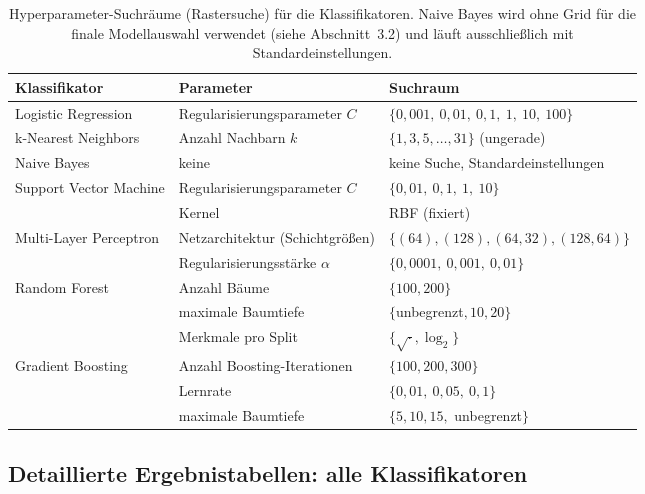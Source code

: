 \documentclass[10pt]{scrartcl}
\begin{document}
\begin{table}[H]
    \centering
    \footnotesize
    \setlength{\tabcolsep}{4pt}
    \caption{Hyperparameter-Suchräume (Rastersuche) für die Klassifikatoren. Naive Bayes wird ohne Grid für die finale Modellauswahl verwendet (siehe Abschnitt~3.2) und läuft ausschließlich mit Standardeinstellungen.}
    \label{tab:hyperparameters}
    \begin{tabular}{|l|l|l|}
        \hline
        \textbf{Klassifikator} & \textbf{Parameter} & \textbf{Suchraum} \\
        \hline
        Logistic Regression
            & Regularisierungsparameter $C$ & $\{0{,}001,\ 0{,}01,\ 0{,}1,\ 1,\ 10,\ 100\}$ \\
        \hline
        k-Nearest Neighbors
            & Anzahl Nachbarn $k$ & $\{1, 3, 5, \dots, 31\}$ (ungerade) \\
        \hline
        Naive Bayes
            & keine & keine Suche, Standardeinstellungen \\
        \hline
        \multirow{2}{*}{Support Vector Machine}
            & Regularisierungsparameter $C$ & $\{0{,}01,\ 0{,}1,\ 1,\ 10\}$ \\
            & Kernel & RBF (fixiert) \\
        \hline
        \multirow{2}{*}{Multi-Layer Perceptron}
            & Netzarchitektur (Schichtgrößen) & $\{(64), (128), (64, 32), (128, 64)\}$ \\
            & Regularisierungsstärke $\alpha$ & $\{0{,}0001,\ 0{,}001,\ 0{,}01\}$ \\
        \hline
        \multirow{3}{*}{Random Forest}
            & Anzahl Bäume & $\{100, 200\}$ \\
            & maximale Baumtiefe & $\{$unbegrenzt$, 10, 20\}$ \\
            & Merkmale pro Split & $\{\sqrt{\cdot}, \log_2\}$ \\
        \hline
        \multirow{3}{*}{Gradient Boosting}
            & Anzahl Boosting-Iterationen & $\{100, 200, 300\}$ \\
            & Lernrate & $\{0{,}01,\ 0{,}05,\ 0{,}1\}$ \\
            & maximale Baumtiefe & $\{5, 10, 15,$ unbegrenzt$\}$ \\
        \hline
    \end{tabular}
\end{table}

\subsection{Detaillierte Ergebnistabellen: alle Klassifikatoren}
\end{document}
